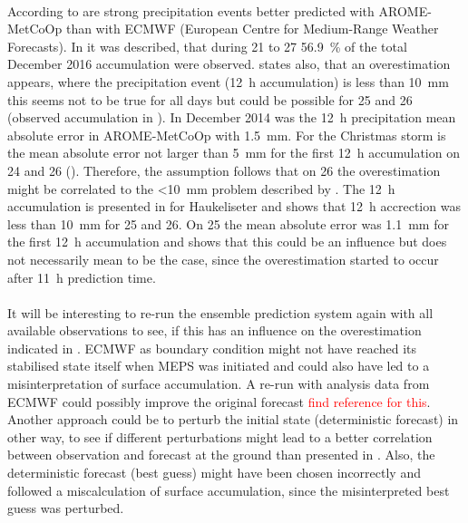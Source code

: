 \\
According to \citet{muller_arome-metcoop:_2017} are strong precipitation events better predicted with AROME-MetCoOp than with ECMWF (European Centre for Medium-Range Weather Forecasts). In  it was described, that during \num{21} to \SI{27}{\dec} \SI{56.9}{\percent} of the total December 2016 accumulation were observed. \citet{muller_arome-metcoop:_2017} states also, that an overestimation appears, where the precipitation event (\SI{12}{\hour} accumulation) is less than \SI{10}{\mm} this seems not to be true for all days but could be possible for 
\num{25} and \SI{26}{\dec}
(observed accumulation in ). In December 2014 was the \SI{12}{\hour} precipitation mean absolute error in AROME-MetCoOp with \SI{1.5}{\mm}. For the Christmas storm is the mean absolute error not larger than \SI{5}{\mm} for the first \SI{12}{\hour} accumulation on \num{24} and \SI{26}{\dec}
(). Therefore, the assumption follows that on \SI{26}{\dec} the overestimation might be correlated to the <\SI{10}{\mm} problem described by \citet{muller_arome-metcoop:_2017}. The \SI{12}{\hour} accumulation is presented in  for Haukeliseter and shows that \SI{12}{\hour} accrection was less than \SI{10}{\mm} for 
\num{25} and \SI{26}{\dec}.
On \SI{25}{\dec} the mean absolute error was \SI{1.1}{\mm} for the first \SI{12}{\hour} accumulation and shows that this could be an influence but does not necessarily mean to be the case, since the overestimation started to occur after \SI{11}{\hour} prediction time. 
\\
\\
It will be interesting to re-run the ensemble prediction system again with all available observations to see, if this has an influence on the overestimation indicated in . ECMWF as boundary condition might not have reached its stabilised state itself when MEPS was initiated and could also have led to a misinterpretation of surface accumulation. A re-run with analysis data from ECMWF could possibly improve the original forecast \textcolor{red}{find reference for this}. 
Another approach could be to perturb the initial state (deterministic forecast) in other way, to see if different perturbations might lead to a better correlation between observation and forecast at the ground than presented in . Also, the deterministic forecast (best guess) might have been chosen incorrectly and followed a miscalculation of surface accumulation, since the misinterpreted best guess was perturbed.

